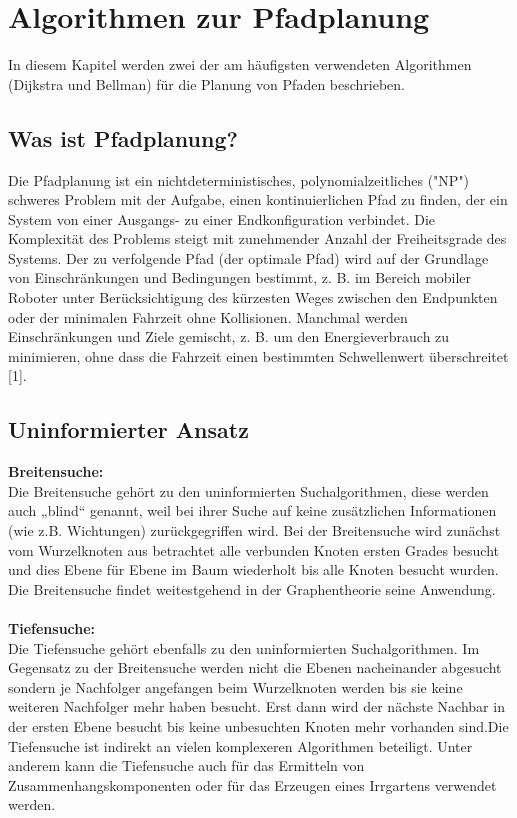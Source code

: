 \chapter{Algorithmen zur Pfadplanung}
In diesem Kapitel werden zwei der am häufigsten verwendeten Algorithmen (Dijkstra und Bellman) für die Planung von Pfaden beschrieben.

\section{Was ist Pfadplanung?}
Die Pfadplanung ist ein nichtdeterministisches, polynomialzeitliches ("NP") schweres Problem mit der Aufgabe, 
einen kontinuierlichen Pfad zu finden, der ein System von einer Ausgangs- zu einer Endkonfiguration verbindet. 
Die Komplexität des Problems steigt mit zunehmender Anzahl der Freiheitsgrade des Systems. Der zu verfolgende 
Pfad (der optimale Pfad) wird auf der Grundlage von Einschränkungen und Bedingungen bestimmt, z. B. im Bereich
mobiler Roboter unter Berücksichtigung des kürzesten Weges zwischen den Endpunkten oder der minimalen Fahrzeit
ohne Kollisionen. Manchmal werden Einschränkungen und Ziele gemischt, z. B. um den Energieverbrauch zu minimieren,
ohne dass die Fahrzeit einen bestimmten Schwellenwert überschreitet [1].

\section{Uninformierter Ansatz}
\label{Uninformierter Ansatz}
\textbf{Breitensuche:}\\
Die Breitensuche gehört zu den uninformierten Suchalgorithmen, diese werden auch „blind“ genannt, weil bei ihrer 
Suche auf keine zusätzlichen Informationen (wie z.B. Wichtungen) zurückgegriffen wird.
Bei der Breitensuche wird zunächst vom Wurzelknoten aus betrachtet alle verbunden Knoten ersten Grades besucht
und dies Ebene für Ebene im Baum wiederholt bis alle Knoten besucht wurden. 
Die Breitensuche findet weitestgehend in der Graphentheorie seine Anwendung.\cite{Russell:10b}
\\
\\
\textbf{Tiefensuche:}\\
Die Tiefensuche gehört ebenfalls zu den uninformierten Suchalgorithmen.
Im Gegensatz zu der Breitensuche werden nicht die Ebenen nacheinander abgesucht sondern je Nachfolger angefangen 
beim Wurzelknoten werden bis sie keine weiteren Nachfolger mehr haben besucht. Erst dann wird der nächste Nachbar 
in der ersten Ebene besucht bis keine unbesuchten Knoten mehr vorhanden sind.Die Tiefensuche ist indirekt an vielen 
komplexeren Algorithmen beteiligt. Unter anderem kann die Tiefensuche auch für das Ermitteln von Zusammenhangskomponenten
oder für das Erzeugen eines Irrgartens verwendet werden.
\cite{Russell:10c}



